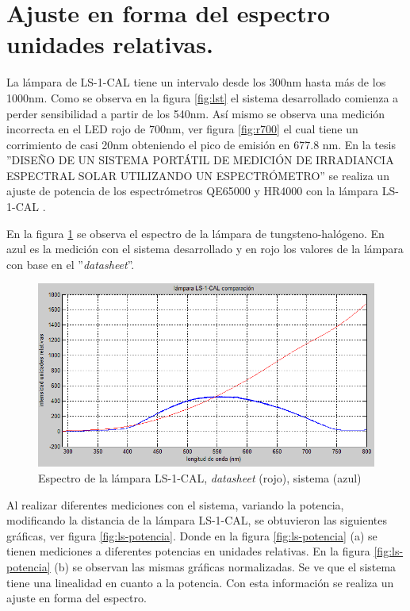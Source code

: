 \newpage
\section{Ajuste en forma del espectro unidades relativas.}
La lámpara de LS-1-CAL tiene un intervalo desde los 300nm hasta más de los 1000nm. Como se observa en la figura \ref{fig:lst} el sistema desarrollado comienza a perder sensibilidad a partir de los 540nm. Así mismo se observa una medición incorrecta en el LED rojo de 700nm, ver figura \ref{fig:r700} el cual tiene un corrimiento de casi 20nm obteniendo el pico de emisión en 677.8 nm. 
En la tesis ''DISEÑO DE UN SISTEMA PORTÁTIL DE MEDICIÓN
DE IRRADIANCIA ESPECTRAL SOLAR
UTILIZANDO UN ESPECTRÓMETRO'' se realiza un ajuste de potencia de los espectrómetros QE65000 y HR4000 con la lámpara LS-1-CAL \cite{DeInvestigacion2020}. 

En la figura \ref{fig:ls-s-ds} se observa el espectro de la lámpara de tungsteno-halógeno. En azul es la medición con el sistema desarrollado y en rojo los valores de la lámpara con base en el ''\textit{datasheet}''.

\begin{figure}[h]
	\centering
	\includegraphics[width=0.9\linewidth]{Imagenes/4/LS-S-DS}
	\caption[Espectro de la lámpara LS-1-CAL, \textit{datasheet} (rojo), sistema (azul)]{Espectro de la lámpara LS-1-CAL, \textit{datasheet} (rojo), sistema (azul)}
	\label{fig:ls-s-ds}
\end{figure}

Al realizar diferentes mediciones con el sistema, variando la potencia, modificando la distancia de la lámpara LS-1-CAL, se obtuvieron las siguientes gráficas, ver figura \ref{fig:ls-potencia}. Donde en la figura \ref{fig:ls-potencia} (a) se tienen mediciones a diferentes potencias en unidades relativas. En la figura \ref{fig:ls-potencia} (b) se observan las mismas gráficas normalizadas. Se ve que el sistema tiene una linealidad en cuanto a la potencia. Con esta información se realiza un ajuste en forma del espectro.  

